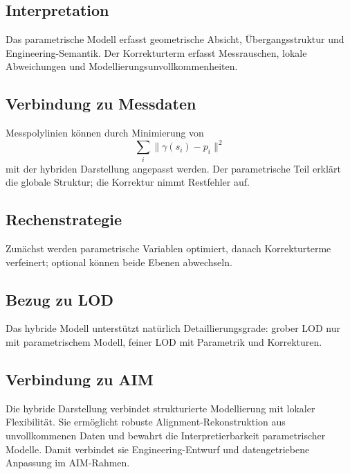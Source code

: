 \subsection{Interpretation}
Das parametrische Modell erfasst geometrische Absicht, Übergangsstruktur und
Engineering-Semantik. Der Korrekturterm erfasst Messrauschen, lokale
Abweichungen und Modellierungsunvollkommenheiten.

\subsection{Verbindung zu Messdaten}
Messpolylinien können durch Minimierung von
\[
\sum_i\|\gamma(s_i)-p_i\|^2
\]
mit der hybriden Darstellung angepasst werden. Der parametrische Teil erklärt
die globale Struktur; die Korrektur nimmt Restfehler auf.

\subsection{Rechenstrategie}
Zunächst werden parametrische Variablen optimiert, danach Korrekturterme
verfeinert; optional können beide Ebenen abwechseln.

\subsection{Bezug zu LOD}
Das hybride Modell unterstützt natürlich Detaillierungsgrade: grober LOD nur
mit parametrischem Modell, feiner LOD mit Parametrik und Korrekturen.

\subsection{Verbindung zu AIM}
\begin{summary}
Die hybride Darstellung verbindet strukturierte Modellierung mit lokaler
Flexibilität. Sie ermöglicht robuste Alignment-Rekonstruktion aus
unvollkommenen Daten und bewahrt die Interpretierbarkeit parametrischer
Modelle. Damit verbindet sie Engineering-Entwurf und datengetriebene Anpassung
im AIM-Rahmen.
\end{summary}
